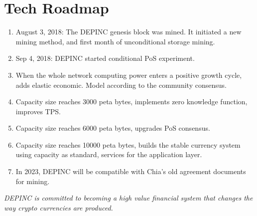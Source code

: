 \chapter{Tech Roadmap}
\begin{enumerate}
    \item August 3, 2018: The DEPINC genesis block was mined. It initiated a new mining method, and first month of unconditional storage mining.
    \item Sep 4, 2018: DEPINC started conditional PoS experiment.
    \item When the whole network computing power enters a positive growth cycle, adds elastic economic. Model according to the community consensus.
    \item Capacity size reaches 3000 peta bytes, implements zero knowledge function, improves TPS.
    \item Capacity size reaches 6000 peta bytes, upgrades PoS consensus.
    \item Capacity size reaches 10000 peta bytes, builds the stable currency system using capacity as standard, services for the application layer.
    \item In 2023, DEPINC will be compatible with Chia's old agreement documents for mining.
\end{enumerate}

\begin{flushleft}
    \textit{DEPINC is committed to becoming a high value financial system that changes the way crypto currencies are produced.}
\end{flushleft}
